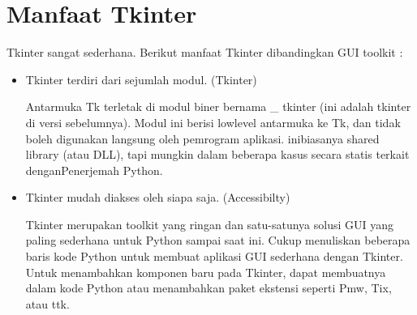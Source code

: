 \section{Manfaat Tkinter} \par
Tkinter sangat sederhana. Berikut manfaat Tkinter dibandingkan GUI toolkit : \par
\noindent 
\begin{itemize}
	\item Tkinter terdiri dari sejumlah modul.  (Tkinter)\vspace{\baselineskip} \par
	Antarmuka Tk terletak di modul biner bernama \_ tkinter (ini adalah tkinter di versi sebelumnya). Modul ini berisi lowlevel antarmuka ke Tk, dan tidak boleh digunakan langsung oleh pemrogram aplikasi. inibiasanya shared library (atau DLL), tapi mungkin dalam beberapa kasus secara statis terkait denganPenerjemah Python.
	\item Tkinter mudah diakses oleh siapa saja. (Accessibilty)\vspace{\baselineskip} \par
	Tkinter merupakan toolkit yang ringan dan satu-satunya solusi GUI yang paling sederhana untuk Python sampai saat ini. Cukup menuliskan beberapa baris kode Python untuk membuat aplikasi GUI sederhana dengan Tkinter. Untuk menambahkan komponen baru pada Tkinter, dapat membuatnya dalam kode Python atau menambahkan paket ekstensi seperti Pmw, Tix, atau ttk.
	

\end{itemize}
